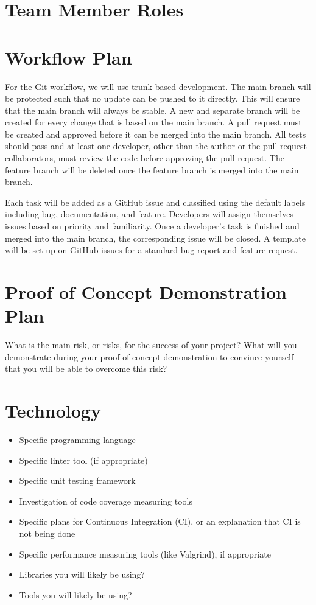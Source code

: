 \documentclass{article}
\begin{document}
\section{Team Member Roles}

\section{Workflow Plan}
For the Git workflow, we will use \href{https://www.atlassian.com/continuous-delivery/continuous-integration/trunk-based-development}{trunk-based development}. The main branch will be protected such that no update can be pushed to it directly. This will ensure that the main branch will always be stable. 
A new and separate branch will be created for every change that is based on the main branch. A pull request must be created and approved before it can be merged into the main branch. All tests should pass and at least one developer, other than the author or the pull request collaborators, must review the code before approving the pull request. The feature branch will be deleted once the feature branch is merged into the main branch.

Each task will be added as a GitHub issue and classified using the default labels including bug, documentation, and feature. Developers will assign themselves issues based on priority and familiarity. Once a developer's task is finished and merged into the main branch, the corresponding issue will be closed. A template will be set up on GitHub issues for a standard bug report and feature request.

\section{Proof of Concept Demonstration Plan}

What is the main risk, or risks, for the success of your project?  What will you
demonstrate during your proof of concept demonstration to convince yourself that
you will be able to overcome this risk?

\section{Technology}

\begin{itemize}
\item Specific programming language
\item Specific linter tool (if appropriate)
\item Specific unit testing framework
\item Investigation of code coverage measuring tools
\item Specific plans for Continuous Integration (CI), or an explanation that CI
  is not being done
\item Specific performance measuring tools (like Valgrind), if
  appropriate
\item Libraries you will likely be using?
\item Tools you will likely be using?
\end{itemize}
\end{document}
